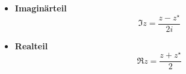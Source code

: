 \documentclass{article}
\newcommand{\lr}[1]{\left(#1\right)}
\begin{document}
	\begin{itemize}
		\item \textbf{Imaginärteil}
			\begin{equation}
				\Im z = \frac{z - z^\star}{2i}
			\end{equation}


		\item \textbf{Realteil}
			\begin{equation}
				\Re z = \frac{z + z^\star}{2}
			\end{equation}
		
		
	\end{itemize}


\newpage
\end{document}
